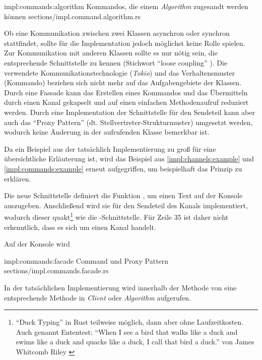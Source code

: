 \rustcinclude
	{impl:commands:algorithm}
	{Kommandos, die einem \textit{Algorithm} zugesandt werden können}
	{sections/impl.command.algorithm.rs}

Ob eine Kommunikation zwischen zwei Klassen asynchron oder synchron stattfindet, sollte für die Implementation jedoch möglichst keine Rolle spielen.
Zur Kommunikation mit anderen Klassen sollte es nur nötig sein, die entsprechende Schnittstelle zu kennen (Stichwort \enquote{loose coupling} \cite[49]{goll2018entwurfsprinzipien}).
Die verwendete Kommunikationstechnologie (\textit{Tokio}) und das Verhaltensmuster (Kommando) beziehen sich nicht mehr auf das Aufgabengebiete der Klassen.
Durch eine Fassade kann das Erstellen eines Kommandos und das Übermitteln durch einen Kanal gekapselt und auf einen einfachen Methodenaufruf reduziert werden.
Durch eine Implementation der Schnittstelle für den Sendeteil kann aber auch das \enquote{Proxy Pattern} (dt. Stellvertreter-Strukturmuster) \cite[137]{goll2018entwurfsprinzipien} umgesetzt werden, wodurch keine Änderung in der aufrufenden Klasse bemerkbar ist.

Da ein Beispiel aus der tatsächlich Implementierung zu groß für eine übersichtliche Erläuterung ist, wird das Beispiel aus \autoref{impl:channels:example} und \autoref{impl:commands:example} erneut aufgegriffen, um beispielhaft das Prinzip zu erklären.

Die neue Schnittstelle  definiert die Funktion , um einen Text auf der Konsole auszugeben.
Anschließend wird sie für den Sendeteil des Kanals implementiert, wodurch dieser quakt\footnote{\enquote{Duck Typing} \cite[44]{rust:orly_programming} in Rust teilweise möglich, dann aber ohne Laufzeitkosten. Auch genannt Ententest: \enquote{When I see a bird that walks like a duck and swims like a duck and quacks like a duck, I call that bird a duck.} von James Whitcomb Riley \cite{wiki:duck}} wie die -Schnittstelle.
Für Zeile 35 ist daher nicht erkenntlich, dass es sich um einen Kanal handelt.

Auf der Konsole wird 

\rustcinclude
	{impl:commands:facade}
	{Command und Proxy Pattern}
	{sections/impl.commands.facade.rs}

In der tatsächlichen Implementierung wird innerhalb der  Methode von  eine entsprechende Methode in \textit{Client} oder \textit{Algorithm} aufgerufen.

